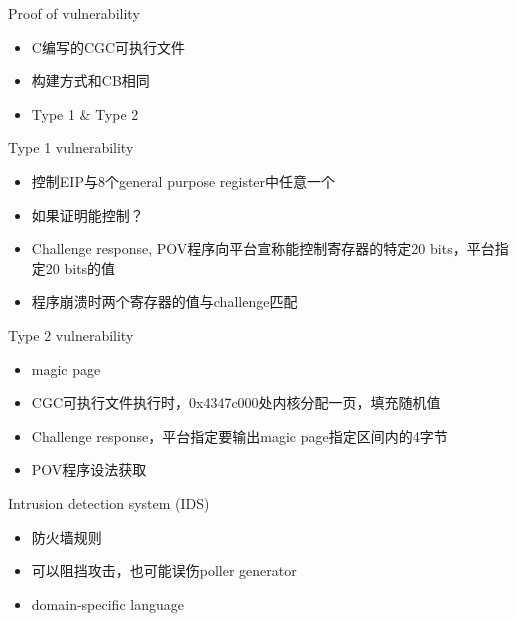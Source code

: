 \documentclass{beamer}
\begin{document}
\begin{frame}
  \begin{block}{Proof of vulnerability}
    \begin{itemize}
      \item C编写的CGC可执行文件
      \item 构建方式和CB相同
      \item Type 1 \& Type 2
    \end{itemize}
  \end{block}
\end{frame}

\begin{frame}
  \begin{block}{Type 1 vulnerability}
    \begin{itemize}[<+-|alert@+>]
      \item 控制EIP与8个general purpose register中任意一个
      \item 如果证明能控制？
      \item Challenge response, POV程序向平台宣称能控制寄存器的特定20 bits，平台指定20 bits的值
      \item 程序崩溃时两个寄存器的值与challenge匹配
    \end{itemize}
  \end{block}
\end{frame}

\begin{frame}
  \begin{block}{Type 2 vulnerability}
    \begin{itemize}
      \item magic page
      \item CGC可执行文件执行时，0x4347c000处内核分配一页，填充随机值
      \item Challenge response，平台指定要输出magic page指定区间内的4字节
      \item POV程序设法获取
    \end{itemize}
  \end{block}
\end{frame}

\begin{frame}
  \begin{block}{Intrusion detection system (IDS)}
    \begin{itemize}
      \item 防火墙规则
      \item 可以阻挡攻击，也可能误伤poller generator
      \item domain-specific language
    \end{itemize}
  \end{block}
\end{frame}
\end{document}
